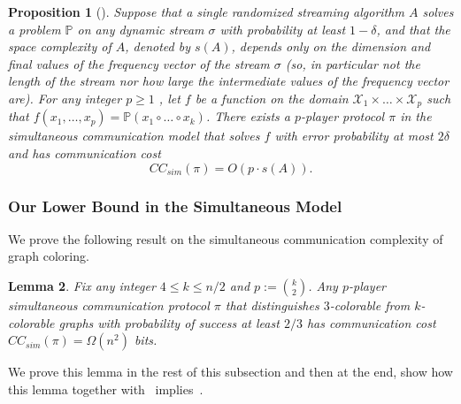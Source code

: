 \documentclass[11pt]{article}
\newtheorem{lemma}{Lemma}[section]
\newtheorem{proposition}[lemma]{Proposition}
\theoremstyle{definition}
\renewcommand{\leq}{\leqslant}
\renewcommand{\geq}{\geqslant}
\newcommand{\rv}[1]{\ensuremath{{\mathsf{#1}}}\xspace}
\newcommand{\rsigma}{\ensuremath{\bm{\sigma}}}
\begin{document}
\begin{proposition}[\!\!\cite{AiHLW16}]\label{prop:dynamic-streaming-to-cc}
    Suppose that a single randomized streaming algorithm $A$ solves a problem $\mathbb{P}$ on any dynamic stream $\sigma$ with probability at least $1-\delta$, 
    and that the space complexity of $A$, denoted by $s(A)$, depends only on the dimension and final values of the frequency vector
    of the stream $\sigma$ (so, in particular not the length of the stream nor how large the intermediate values of the frequency vector are). For any integer $p \geq 1$ , let $f$ be a function 
    on the domain $\mathcal{X}_1\times\ldots\times \mathcal{X}_p$ such that $f(x_1,\ldots,x_p) = \mathbb{P}(x_1 \circ \ldots \circ x_k)$. There exists a $p$-player protocol $\pi$ in the 
    simultaneous communication model that solves $f$ with error probability at most $2\delta$ and has communication cost 
    \[
    	CC_{sim}(\pi) = O(p \cdot s(A)). 
    \]
   \end{proposition}



\newcommand{\DD}{\mathcal{D}}

\newcommand{\nbase}{\ensuremath{n_{base}}}

\newcommand{\ustar}{u^*}
\newcommand{\vstar}{v^*}
\newcommand{\jstar}{j^*}

\newcommand{\rTheta}{\rv{\Theta}}
\newcommand{\rJ}{\rv{J}}


\newcommand{\rPi}{\rv{\Pi}}



\subsubsection{Our Lower Bound in the Simultaneous Model}\label{sec:sim-lower}

We prove the following result on the simultaneous communication complexity of graph coloring. 

\begin{lemma}\label{lem:sim}
	Fix any integer $4 \leq k \leq n/2$ and $p := \binom{k}{2}$. Any $p$-player simultaneous communication protocol $\pi$ that distinguishes $3$-colorable from $k$-colorable graphs with 
	probability of success at least $2/3$ has communication cost $CC_{sim}(\pi) = \Omega(n^2)$ bits. 
\end{lemma}

We prove this lemma in the rest of this subsection and then at the end, show how this lemma together with~ implies~. 
\end{document}
